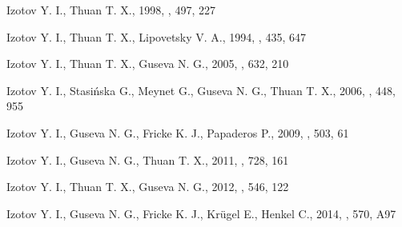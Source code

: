 \begin{thebibliography}{}



 Izotov Y. I., Thuan T. X., 
1998, \apj, 497, 227



 Izotov Y. I.,
Thuan T. X., Lipovetsky V. A., 1994, \apj, 435, 647


 Izotov Y. I., 
Thuan T. X., Guseva N. G., 2005, \apj, 632, 210

 Izotov Y. I., Stasi\'nska G., Meynet G., 
Guseva N. G., Thuan T. X., 2006, \aap, 448, 955



 Izotov Y. I., Guseva N. G., Fricke K. J.,
Papaderos P., 2009, \aap, 503, 61

 Izotov Y. I., 
Guseva N. G., Thuan T. X., 2011, \apj, 728, 161

 Izotov Y. I., 
Thuan T. X., Guseva N. G., 2012, \aap, 546, 122



 Izotov Y. I., Guseva N. G., 
Fricke K. J., Kr\"ugel E., Henkel C., 2014, \aap, 570, A97


\end{thebibliography}

